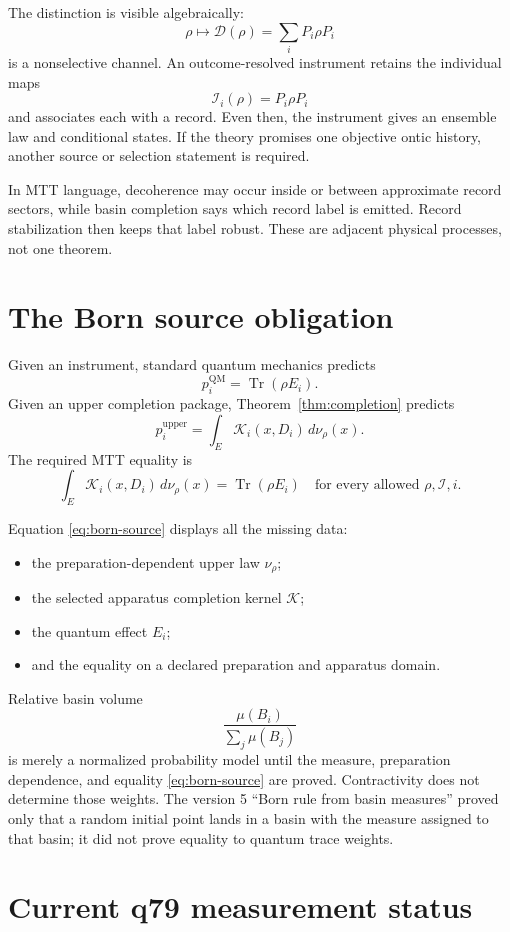 \documentclass[11pt,a4paper]{article}
\theoremstyle{definition}
\theoremstyle{remark}
\newcommand{\Tr}{\operatorname{Tr}}
\newcommand{\cI}{\mathcal{I}}
\newcommand{\cK}{\mathcal{K}}
\newcommand{\cD}{\mathcal{D}}
\begin{document}
The distinction is visible algebraically:
\[
\rho
\longmapsto
\cD(\rho)
=\sum_iP_i\rho P_i
\]
is a nonselective channel. An outcome-resolved instrument retains the
individual maps
\[
\cI_i(\rho)=P_i\rho P_i
\]
and associates each with a record. Even then, the instrument gives an ensemble
law and conditional states. If the theory promises one objective ontic
history, another source or selection statement is required.

In MTT language, decoherence may occur inside or between approximate record
sectors, while basin completion says which record label is emitted. Record
stabilization then keeps that label robust. These are adjacent physical
processes, not one theorem.

\section{The Born source obligation}

Given an instrument, standard quantum mechanics predicts
\[
p_i^{\mathrm{QM}}=\Tr(\rho E_i).
\]
Given an upper completion package, Theorem~\ref{thm:completion} predicts
\[
p_i^{\mathrm{upper}}
=\int_E\cK_i(x,D_i)\,d\nu_\rho(x).
\]
The required MTT equality is
\begin{equation}
\boxed{
\int_E\cK_i(x,D_i)\,d\nu_\rho(x)
=\Tr(\rho E_i)
\quad\text{for every allowed }\rho,\cI,i.
}
\label{eq:born-source}
\end{equation}

Equation \eqref{eq:born-source} displays all the missing data:
\begin{itemize}
\item the preparation-dependent upper law \(\nu_\rho\);
\item the selected apparatus completion kernel \(\cK\);
\item the quantum effect \(E_i\);
\item and the equality on a declared preparation and apparatus domain.
\end{itemize}

Relative basin volume
\[
\frac{\mu(B_i)}{\sum_j\mu(B_j)}
\]
is merely a normalized probability model until the measure, preparation
dependence, and equality \eqref{eq:born-source} are proved. Contractivity does
not determine those weights. The version 5 ``Born rule from basin measures''
proved only that a random initial point lands in a basin with the measure
assigned to that basin; it did not prove equality to quantum trace weights.

\section{Current q79 measurement status}
\end{document}
